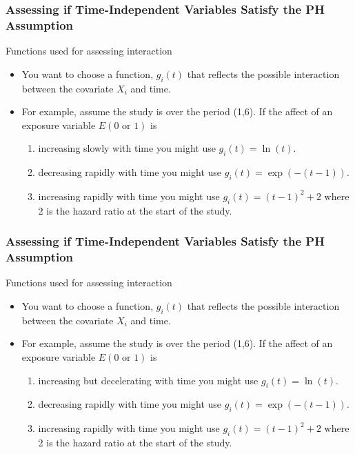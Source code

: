 \documentclass{beamer}
\theoremstyle{definition}
\begin{document}
\begin{frame} 
\frametitle{Assessing if Time-Independent Variables Satisfy the PH Assumption}
\begin{block}{Functions used for assessing interaction} 
\begin{itemize}
\item You want to choose a function, $g_i(t)$ that reflects the possible interaction between the covariate $X_i$ and time. 
\item For example, assume the study is over the period (1,6). If the affect of an exposure variable $E (0 \text{ or } 1)$ is 
\begin{enumerate} 
\item increasing slowly with time you might use $g_i(t)= \ln(t)$. 
\item decreasing rapidly with time you might use $g_i(t)=\exp(-(t-1))$. 
\item increasing rapidly with time you might use $g_i(t)=(t-1)^2+2$ where 2 is the hazard ratio at the start of the study. 
\end{enumerate}
\end{itemize} 
\end{block}
\end{frame} 

\begin{frame}
\frametitle{Assessing if Time-Independent Variables Satisfy the PH Assumption}
\begin{block}{Functions used for assessing interaction}
\begin{itemize}
\item You want to choose a function, $g_i(t)$ that reflects the possible interaction between the covariate $X_i$ and time.
\item For example, assume the study is over the period (1,6). If the affect of an exposure variable $E (0 \text{ or } 1)$ is
\begin{enumerate}
\item increasing  but decelerating with time you might use $g_i(t)= \ln(t)$.
\item decreasing rapidly with time you might use $g_i(t)=\exp(-(t-1))$.
\item increasing rapidly with time you might use $g_i(t)=(t-1)^2+2$ where 2 is the hazard ratio at the start of the study.
\end{enumerate}
\end{itemize}
\end{block}
\end{frame}   
\end{document}
